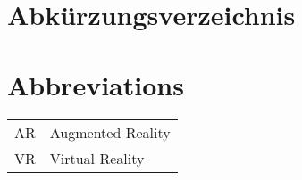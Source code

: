 \ifmmtlanguagegerman
\section*{Abkürzungsverzeichnis}
\else
\section*{Abbreviations}
\fi

\begin{table}[h]		
	\begin{tabular}{ll}
		AR & Augmented Reality \\
		VR & Virtual Reality
	\end{tabular}
\end{table}